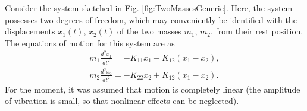 Consider the system sketched in Fig. \ref{fig:TwoMassesGeneric}. Here, the system possesses two degrees of freedom, which may conveniently be identified with the displacements $x_1(t)$, $x_2(t)$ of the two masses $m_1$, $m_2$, from their rest position. The equations of motion for this system are as
\begin{subequations}\label{eq:TwoMass1}
\begin{align}
m_1 \frac{d^2 x_1}{dt^2} = -K_{11}x_1 - K_{12}(x_1 - x_2), \label{eq:Coupl1} \\
m_2 \frac{d^2 x_2}{dt^2} = -K_{22}x_2 + K_{12}(x_1 - x_2). \label{eq:Coupl2}
\end{align}
\end{subequations}
For the moment, it was assumed that motion is completely linear (the amplitude of vibration is small, so that nonlinear effects can be neglected). 



